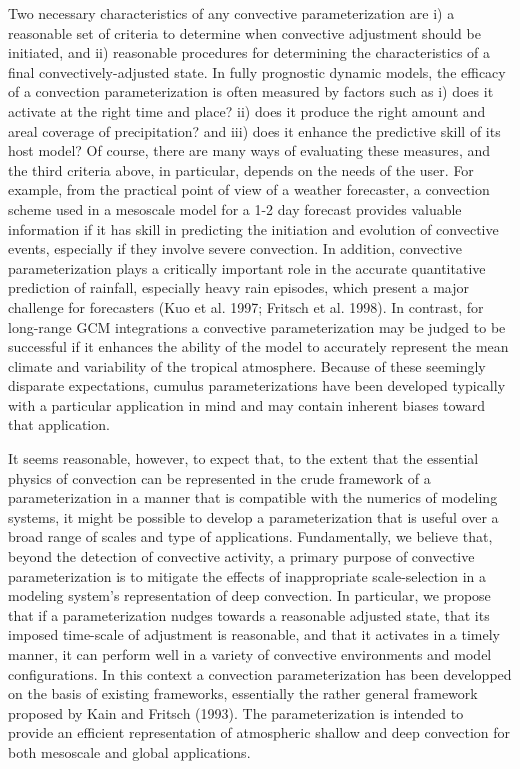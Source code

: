 Two necessary characteristics of any convective parameterization are i) a
reasonable set of criteria to determine when convective adjustment should be
initiated, and ii) reasonable procedures for determining the characteristics of
a final convectively-adjusted state.
 In fully
prognostic dynamic models, the efficacy of a convection parameterization is
often measured by factors such as  i)  does it activate at the right time and
place?  ii)  does it produce the right amount and areal coverage of
precipitation?  and iii)  does it enhance the predictive skill of
its host model?
Of course, there are many ways of evaluating these measures, and the third
criteria above, in particular, depends on the needs of the user.  For example,
from the practical point of view of a weather forecaster, a convection scheme
used in a mesoscale model for a 1-2 day forecast provides valuable information
if it has skill in predicting the initiation and evolution of convective events,
especially if they involve severe convection.  In addition, convective
parameterization plays a critically important role in the accurate quantitative
prediction of rainfall, especially heavy rain episodes, which present a major
challenge for forecasters (Kuo et al. 1997; Fritsch et al. 1998).
In contrast, for long-range
GCM integrations a convective parameterization may be judged to be successful if
it enhances the ability of the model to accurately represent the mean climate
and variability of the tropical atmosphere. Because of these seemingly
disparate expectations, cumulus parameterizations have been developed typically
with a particular application in mind and may contain inherent biases toward
that application.

It seems reasonable, however, to expect that, to the extent that the essential
physics of convection can be represented in the crude framework of a
parameterization in a manner that is compatible with the numerics of modeling
systems, it might be possible to develop a parameterization that is useful over
a broad range of scales and type of applications.  Fundamentally, we believe
that, beyond the detection of convective activity, a primary purpose of
convective parameterization is to mitigate the effects of inappropriate
scale-selection in a modeling system's representation of deep convection.  In
particular,  we propose that if a parameterization nudges towards a reasonable
adjusted state, that its imposed time-scale of adjustment is reasonable, and
that it activates in a timely manner, it can perform well in a variety of
convective environments and model configurations.
In this context a convection parameterization has been developped
on the basis of existing frameworks,
essentially the rather general framework proposed by Kain and Fritsch (1993).
The parameterization is intended to provide an efficient representation
of atmospheric
shallow and deep convection for both mesoscale and global applications.

